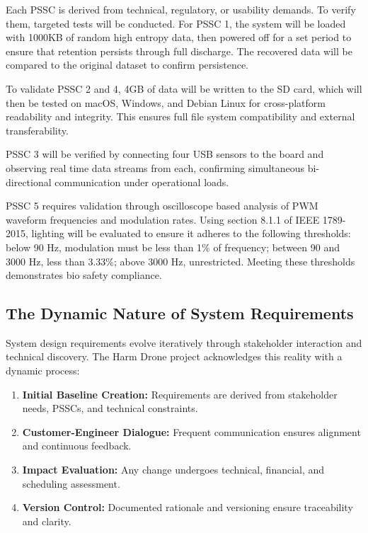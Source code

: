 \documentclass[12pt]{article}
\begin{document}
\par Each PSSC is derived from technical, regulatory, or usability demands. To verify them, targeted tests will be conducted. For PSSC 1, the system will be loaded with 1000KB of random high entropy data, then powered off for a set period to ensure that retention persists through full discharge. The recovered data will be compared to the original dataset to confirm persistence.

\par To validate PSSC 2 and 4, 4GB of data will be written to the SD card, which will then be tested on macOS, Windows, and Debian Linux for cross-platform readability and integrity. This ensures full file system compatibility and external transferability.

\par PSSC 3 will be verified by connecting four USB sensors to the board and observing real time data streams from each, confirming simultaneous bi-directional communication under operational loads.

\par PSSC 5 requires validation through oscilloscope based analysis of PWM waveform frequencies and modulation rates. Using section 8.1.1 of IEEE 1789-2015, lighting will be evaluated to ensure it adheres to the following thresholds: below 90 Hz, modulation must be less than 1\% of frequency; between 90 and 3000 Hz, less than 3.33\%; above 3000 Hz, unrestricted. Meeting these thresholds demonstrates bio safety compliance.

\subsection{The Dynamic Nature of System Requirements}

\par System design requirements evolve iteratively through stakeholder interaction and technical discovery. The Harm Drone project acknowledges this reality with a dynamic process:

\begin{enumerate}
    \item \textbf{Initial Baseline Creation:} Requirements are derived from stakeholder needs, PSSCs, and technical constraints.
    \item \textbf{Customer-Engineer Dialogue:} Frequent communication ensures alignment and continuous feedback.
    \item \textbf{Impact Evaluation:} Any change undergoes technical, financial, and scheduling assessment.
    \item \textbf{Version Control:} Documented rationale and versioning ensure traceability and clarity.
\end{enumerate}
\end{document}
